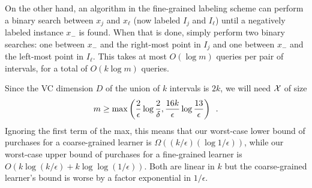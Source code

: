 On the other hand, an algorithm in the fine-grained labeling scheme
can perform a binary search between $x_j$ and $x_\ell$  (now labeled
$I_j$ and $I_\ell$) until a negatively labeled instance $x_-$ is found.  When
that is done, simply perform two binary searches: one between $x_-$ and
the right-most point in $I_j$ and one between $x_-$ and
the left-most point in $I_\ell$. This takes at most $O(\log m)$ queries
per pair of intervals, for a total of $O(k \log m)$ queries.


Since the VC dimension $D$ of the union of $k$ intervals is $2k$, we will need
$\cal X$ of size 
\[
m \ge \max \left( {2 \over \epsilon} \log {2 \over \delta}, {16 k \over \epsilon} \log {13
\over \epsilon}  \right)
\enspace .
\]
Ignoring the first term of the max, this means that our worst-case lower bound 
of purchases for a coarse-grained learner is $\Omega ((k / \epsilon ) (\log 1/\epsilon))$,
while our worst-case upper bound of purchases for a fine-grained learner is
$O(k \log (k/\epsilon) + k \log \log (1/\epsilon))$. Both are linear in $k$ but the
coarse-grained learner's bound is worse by a factor  exponential in $1/\epsilon$.

